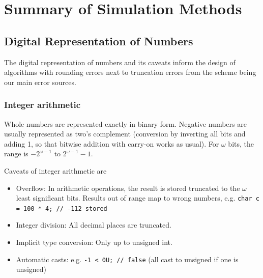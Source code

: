 \section{Summary of Simulation Methods}

\subsection*{Digital Representation of Numbers}
The digital representation of numbers and its caveats
inform the design of algorithms with rounding errors
next to truncation errors from the scheme being
our main error sources.

\subsubsection*{Integer arithmetic}
Whole numbers are represented exactly in binary form.
Negative numbers are usually represented as two's complement
(conversion by inverting all bits and adding 1, so that bitwise 
addition with carry-on works as usual). For $\omega$ bits,
the range is $-2^{\omega-1}$ to $2^{\omega-1}-1$.

\textcolor{red1}{Caveats of integer arithmetic} are
\begin{itemize}
    \item Overflow: In arithmetic operations, the result is stored truncated 
    to the $\omega$ least significant bits. Results out of range map to 
    wrong numbers, e.g. \texttt{char c = 100 * 4; // -112 stored}
    \item Integer division: All decimal places are truncated.
    \item Implicit type conversion: Only up to unsigned int.
    \item Automatic casts: e.g. \texttt{-1 < 0U; // false} (all cast to unsigned if one is unsigned)
\end{itemize}


